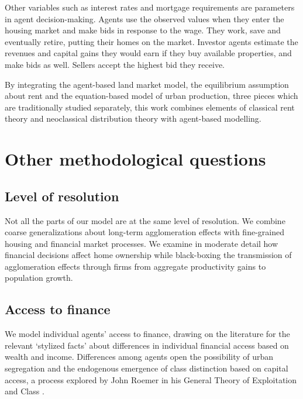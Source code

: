 Other variables such as interest rates and mortgage requirements are parameters in agent decision-making. Agents use the observed values when they enter the housing market and make bids in response to the wage. They work, save and eventually retire, putting their homes on the market. Investor agents estimate the revenues and capital gains they would earn if they buy available properties, and make bids as well. Sellers accept the highest bid they receive. 

By integrating the agent-based land market model, the equilibrium assumption about rent and the equation-based model of urban production, three pieces which are traditionally studied separately, this work combines elements of classical rent theory and neoclassical distribution theory with agent-based modelling.



\section{Other methodological questions}\label{sec-other}
\subsection{Level of resolution}
Not all the parts of our model are at the same level of resolution. We combine coarse generalizations about long-term agglomeration effects with fine-grained housing and financial market processes. We examine in moderate detail how financial decisions affect home ownership while black-boxing the transmission of agglomeration effects through firms from aggregate productivity gains to population growth. 

\subsection{Access to finance}
We model individual agents' access to finance, %
drawing on the literature for the relevant `\gls{stylized facts}' about differences in individual financial access based on wealth and income. Differences among agents open the possibility of urban segregation and the endogenous emergence of \gls{class} distinction based on capital access, a process explored by John Roemer in his General Theory of Exploitation and Class \cite{roemerGeneralTheoryExploitation1982}.  

